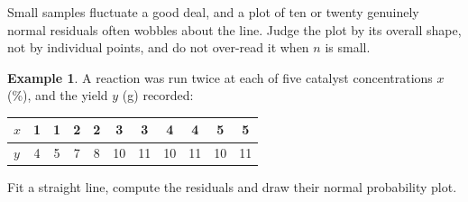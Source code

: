 \documentclass[11pt,a4paper]{article}
\numberwithin{equation}{section}
\theoremstyle{definition}
\newtheorem{exa}[thm]{Example}
\begin{document}
Small samples fluctuate a good deal, and a plot of ten or twenty genuinely normal residuals
often wobbles about the line. Judge the plot by its overall shape, not by individual
points, and do not over-read it when $n$ is small.

\begin{exa}\label{exa:catalyst}
A reaction was run twice at each of five catalyst concentrations $x$ (\%), and the yield
$y$ (g) recorded:
\begin{center}
\begin{tabular}{l|cccccccccc}
$x$ & 1 & 1 & 2 & 2 & 3 & 3 & 4 & 4 & 5 & 5 \\
\hline
$y$ & 4 & 5 & 7 & 8 & 10 & 11 & 10 & 11 & 10 & 11 \\
\end{tabular}
\end{center}
Fit a straight line, compute the residuals and draw their normal probability plot.
\end{exa}
\end{document}
